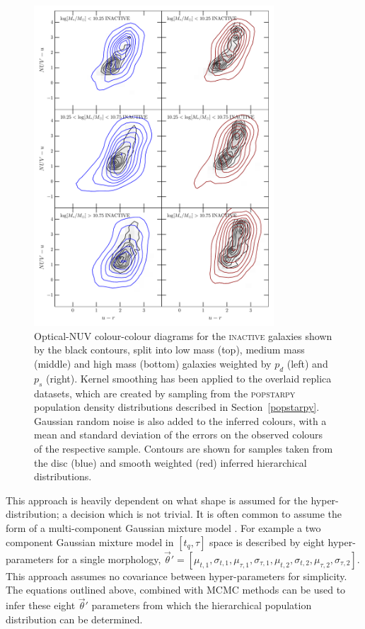\begin{figure}
\begin{centering}
\includegraphics[width=0.8\textwidth]{starpy/figc3b.pdf}
\caption[Replica colour-colour distributions using the \textsc{popstarpy} method]{Optical-NUV colour-colour diagrams for the \textsc{inactive} galaxies shown by the black contours, split into low mass (top), medium mass (middle) and high mass (bottom) galaxies weighted by $p_d$ (left) and $p_s$ (right). Kernel smoothing has been applied to the overlaid replica datasets, which are created by sampling from the \textsc{popstarpy} population density distributions described in Section~\ref{popstarpy}. Gaussian random noise is also added to the inferred colours, with a mean and standard deviation of the errors on the observed colours of the respective sample. Contours are shown for samples taken from the disc (blue) and smooth weighted (red) inferred hierarchical distributions.}
\label{replicapop}
\end{centering}
\end{figure}

This approach is heavily dependent on what shape is assumed for the hyper-distribution; a decision which is not trivial. It is often common to assume the form of a multi-component Gaussian mixture model \citep{mackay03, lahav00}. For example a two component Gaussian mixture model in $[t_q, \tau]$ space is described by eight hyper-parameters for a single morphology, $\vec{\theta}' = [\mu_{t,1}, \sigma_{t,1}, \mu_{\tau,1}, \sigma_{\tau,1}, \mu_{t,2}, \sigma_{t,2}, \mu_{\tau,2}, \sigma_{\tau,2}]$. This approach assumes no covariance between hyper-parameters for simplicity. The equations outlined above, combined with MCMC methods can be used to infer these eight $\vec{\theta}'$ parameters from which the hierarchical population distribution can be determined. 

